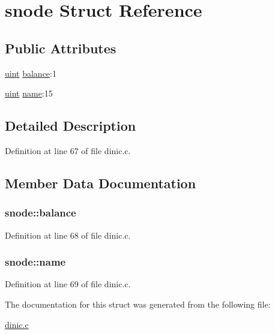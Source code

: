 \hypertarget{structsnode}{
\section{snode Struct Reference}
\label{structsnode}
}
\subsection*{Public Attributes}
\begin{DoxyCompactItemize}
\item 
\hyperlink{dinic_8c_a91ad9478d81a7aaf2593e8d9c3d06a14}{uint} \hyperlink{structsnode_a20c9fbb3668dd7ac6cd855f34cc67dce}{balance}:1
\item 
\hyperlink{dinic_8c_a91ad9478d81a7aaf2593e8d9c3d06a14}{uint} \hyperlink{structsnode_a2a2e2e07b8df52dc779dd0f5de768b2a}{name}:15
\end{DoxyCompactItemize}


\subsection{Detailed Description}


Definition at line 67 of file dinic.c.



\subsection{Member Data Documentation}
\hypertarget{structsnode_a20c9fbb3668dd7ac6cd855f34cc67dce}{
\subsubsection[{balance}]{ {\bf snode::balance}}}
\label{structsnode_a20c9fbb3668dd7ac6cd855f34cc67dce}


Definition at line 68 of file dinic.c.

\hypertarget{structsnode_a2a2e2e07b8df52dc779dd0f5de768b2a}{
\subsubsection[{name}]{ {\bf snode::name}}}
\label{structsnode_a2a2e2e07b8df52dc779dd0f5de768b2a}


Definition at line 69 of file dinic.c.



The documentation for this struct was generated from the following file:\begin{DoxyCompactItemize}
\item 
\hyperlink{dinic_8c}{dinic.c}\end{DoxyCompactItemize}
